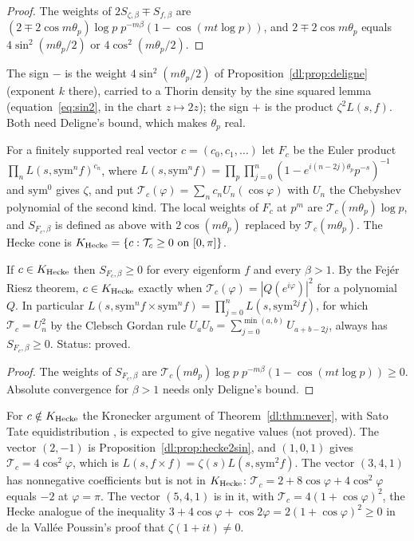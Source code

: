 \begin{proof}
The weights of $2S_{\zeta,\beta}\mp S_{f,\beta}$ are $(2\mp2\cos m\theta_p)\log p\;p^{-m\beta}(1-\cos(mt\log p))$, and $2\mp2\cos m\theta_p$ equals $4\sin^2(m\theta_p/2)$ or $4\cos^2(m\theta_p/2)$.
\end{proof}

The sign $-$ is the weight $4\sin^2(m\theta_p/2)$ of Proposition~\ref{dl:prop:deligne} (exponent $k$ there), carried to a Thorin density by the sine squared lemma (equation~\eqref{eq:sin2}, in the chart $z\mapsto2z$); the sign $+$ is the product $\zeta^2L(s,f)$. Both need Deligne's bound, which makes $\theta_p$ real.

For a finitely supported real vector $c=(c_0,c_1,\dots)$ let $F_c$ be the Euler product $\prod_n L(s,\mathrm{sym}^nf)^{c_n}$, where $L(s,\mathrm{sym}^nf)=\prod_p\prod_{j=0}^n(1-e^{i(n-2j)\theta_p}p^{-s})^{-1}$ and $\mathrm{sym}^0$ gives $\zeta$, and put $\mathcal T_c(\varphi)=\sum_nc_nU_n(\cos\varphi)$ with $U_n$ the Chebyshev polynomial of the second kind. The local weights of $F_c$ at $p^m$ are $\mathcal T_c(m\theta_p)\log p$, and $S_{F_c,\beta}$ is defined as above with $2\cos(m\theta_p)$ replaced by $\mathcal T_c(m\theta_p)$. The Hecke cone is $K_{\rm Hecke}=\{c:\mathcal T_c\ge0\ \text{on}\ [0,\pi]\}$.

\begin{theorem}\label{dl:thm:cone}
If $c\in K_{\rm Hecke}$ then $S_{F_c,\beta}\ge0$ for every eigenform $f$ and every $\beta>1$. By the Fej\'er Riesz theorem, $c\in K_{\rm Hecke}$ exactly when $\mathcal T_c(\varphi)=|Q(e^{i\varphi})|^2$ for a polynomial $Q$. In particular $L(s,\mathrm{sym}^nf\times\mathrm{sym}^nf)=\prod_{j=0}^nL(s,\mathrm{sym}^{2j}f)$, for which $\mathcal T_c=U_n^2$ by the Clebsch Gordan rule $U_aU_b=\sum_{j=0}^{\min(a,b)}U_{a+b-2j}$, always has $S_{F_c,\beta}\ge0$. Status: proved.
\end{theorem}

\begin{proof}
The weights of $S_{F_c,\beta}$ are $\mathcal T_c(m\theta_p)\log p\;p^{-m\beta}(1-\cos(mt\log p))\ge0$. Absolute convergence for $\beta>1$ needs only Deligne's bound.
\end{proof}

For $c\notin K_{\rm Hecke}$ the Kronecker argument of Theorem~\ref{dl:thm:never}, with Sato Tate equidistribution \cite{BLGHT11}, is expected to give negative values (not proved). The vector $(2,-1)$ is Proposition~\ref{dl:prop:hecke2sin}, and $(1,0,1)$ gives $\mathcal T_c=4\cos^2\varphi$, which is $L(s,f\times f)=\zeta(s)L(s,\mathrm{sym}^2f)$. The vector $(3,4,1)$ has nonnegative coefficients but is not in $K_{\rm Hecke}$: $\mathcal T_c=2+8\cos\varphi+4\cos^2\varphi$ equals $-2$ at $\varphi=\pi$. The vector $(5,4,1)$ is in it, with $\mathcal T_c=4(1+\cos\varphi)^2$, the Hecke analogue of the inequality $3+4\cos\varphi+\cos2\varphi=2(1+\cos\varphi)^2\ge0$ in de la Vall\'ee Poussin's proof that $\zeta(1+it)\ne0$.

